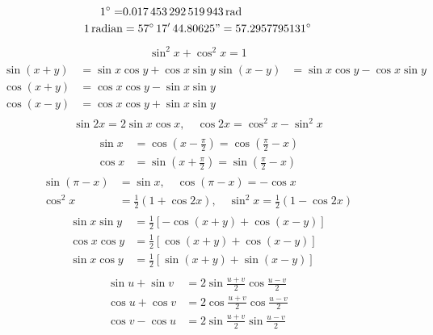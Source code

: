 %
\begin{align*}
1^{\circ}=&\SI{0.017453292519943}{\radian}\\
\SI{1}{radian}&=57^\circ\,17'\,44.80625"=57.2957795131^{\circ}
\end{align*}
%
\begin{align}
\sin^2x+\cos^2x=1
\end{align}
%
\begin{gather}
\begin{aligned}\label{مساوات_ضمیمہ_مفید_چھ}
\sin(x+y)&=\sin x\cos y+\cos x\sin y
\sin(x-y)&=\sin x\cos y-\cos x\sin y\\
\cos(x+y)&=\cos x\cos y-\sin x\sin y\\
\cos(x-y)&=\cos x\cos y+\sin x\sin y
\end{aligned}
\end{gather}
%
\begin{align}
\sin 2x=2\sin x\cos x, \quad \cos 2x=\cos^2x-\sin^2x
\end{align}
%
\begin{gather}
\begin{aligned}
\sin x&=\cos\left(x-\frac{\pi}{2}\right)=\cos\left(\frac{\pi}{2}-x\right)\\
\cos x&=\sin\left(x+\frac{\pi}{2}\right)=\sin\left(\frac{\pi}{2}-x\right)
\end{aligned}
\end{gather}
%
\begin{align}
\sin(\pi-x)&=\sin x,\quad \cos(\pi-x)=-\cos x\\
\cos^2x&=\frac{1}{2}(1+\cos 2x),\quad \sin^2x=\frac{1}{2}(1-\cos 2x)
\end{align}
%
\begin{gather}
\begin{aligned}\label{مساوات_ضمیمہ_مفید_گیارہ}
\sin x\sin y&=\frac{1}{2}[-\cos(x+y)+\cos(x-y)]\\
\cos x\cos y&=\frac{1}{2}[\cos(x+y)+\cos(x-y)]\\
\sin x\cos y&=\frac{1}{2}[\sin(x+y)+\sin(x-y)]
\end{aligned}
\end{gather}
%
\begin{gather}
\begin{aligned}
\sin u+\sin v&=2\sin \frac{u+v}{2}\cos\frac{u-v}{2}\\
\cos u+\cos v&=2\cos\frac{u+v}{2}\cos\frac{u-v}{2}\\
\cos v-\cos u&=2\sin\frac{u+v}{2}\sin\frac{u-v}{2}
\end{aligned}
\end{gather}
